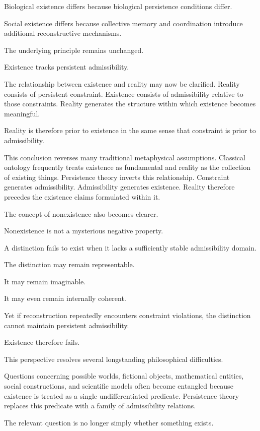\documentclass[12pt,oneside]{article}
\theoremstyle{definition}
\begin{document}
Biological existence differs because biological persistence conditions differ.

Social existence differs because collective memory and coordination introduce additional reconstructive mechanisms.

The underlying principle remains unchanged.

Existence tracks persistent admissibility.

The relationship between existence and reality may now be clarified. Reality consists of persistent constraint. Existence consists of admissibility relative to those constraints. Reality generates the structure within which existence becomes meaningful.

Reality is therefore prior to existence in the same sense that constraint is prior to admissibility.

This conclusion reverses many traditional metaphysical assumptions. Classical ontology frequently treats existence as fundamental and reality as the collection of existing things. Persistence theory inverts this relationship. Constraint generates admissibility. Admissibility generates existence. Reality therefore precedes the existence claims formulated within it.

The concept of nonexistence also becomes clearer.

Nonexistence is not a mysterious negative property.

A distinction fails to exist when it lacks a sufficiently stable admissibility domain.

The distinction may remain representable.

It may remain imaginable.

It may even remain internally coherent.

Yet if reconstruction repeatedly encounters constraint violations, the distinction cannot maintain persistent admissibility.

Existence therefore fails.

This perspective resolves several longstanding philosophical difficulties.

Questions concerning possible worlds, fictional objects, mathematical entities, social constructions, and scientific models often become entangled because existence is treated as a single undifferentiated predicate. Persistence theory replaces this predicate with a family of admissibility relations.

The relevant question is no longer simply whether something exists.
\end{document}
